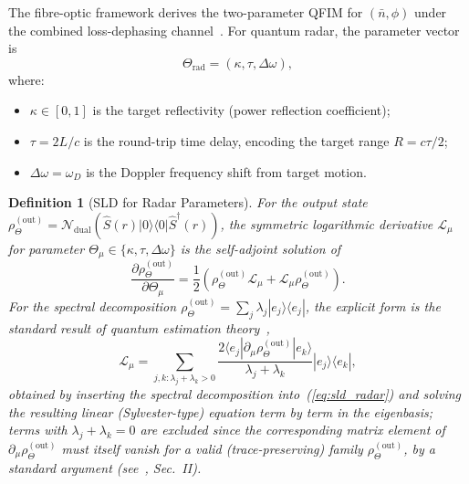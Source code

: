 \documentclass[journal]{IEEEtran}
\newtheorem{definition}{Definition}
\begin{document}
The fibre-optic framework derives the two-parameter QFIM for $(\bar{n}, \phi)$ under the combined loss-dephasing channel~\cite{gautum2024rigorous}. For quantum radar, the parameter vector is
\begin{equation}\label{eq:radar_params}
\Theta_{\text{rad}} = (\kappa, \tau, \Delta\omega),
\end{equation}
where:
\begin{itemize}
    \item $\kappa \in [0,1]$ is the target reflectivity (power reflection coefficient);
    \item $\tau = 2L/c$ is the round-trip time delay, encoding the target range $R = c\tau/2$;
    \item $\Delta\omega = \omega_D$ is the Doppler frequency shift from target motion.
\end{itemize}

\begin{definition}[SLD for Radar Parameters]\label{def:sld_radar}
For the output state $\rho_{\Theta}^{(\text{out})} = \mathcal{N}_{\text{dual}}(\hat{S}(r)|0\rangle\langle 0|\hat{S}^\dagger(r))$, the symmetric logarithmic derivative $\mathcal{L}_\mu$ for parameter $\Theta_\mu \in \{\kappa, \tau, \Delta\omega\}$ is the self-adjoint solution of
\begin{equation}\label{eq:sld_radar}
\frac{\partial\rho_{\Theta}^{(\text{out})}}{\partial\Theta_\mu} = \frac{1}{2}\left(\rho_{\Theta}^{(\text{out})}\mathcal{L}_\mu + \mathcal{L}_\mu\rho_{\Theta}^{(\text{out})}\right).
\end{equation}
For the spectral decomposition $\rho_{\Theta}^{(\text{out})} = \sum_j \lambda_j |e_j\rangle\langle e_j|$, the explicit form is the standard result of quantum estimation theory~\cite{paris2009quantum,braunstein1994statistical},
\begin{equation}\label{eq:sld_explicit}
\mathcal{L}_\mu = \sum_{j,k: \lambda_j + \lambda_k > 0} \frac{2\langle e_j|\partial_\mu\rho_{\Theta}^{(\text{out})}|e_k\rangle}{\lambda_j + \lambda_k} |e_j\rangle\langle e_k|,
\end{equation}
obtained by inserting the spectral decomposition into~(\ref{eq:sld_radar}) and solving the resulting linear (Sylvester-type) equation term by term in the eigenbasis; terms with $\lambda_j+\lambda_k=0$ are excluded since the corresponding matrix element of $\partial_\mu\rho_\Theta^{(\text{out})}$ must itself vanish for a valid (trace-preserving) family $\rho_\Theta^{(\text{out})}$, by a standard argument (see~\cite{paris2009quantum}, Sec.~II).
\end{definition}
\end{document}
